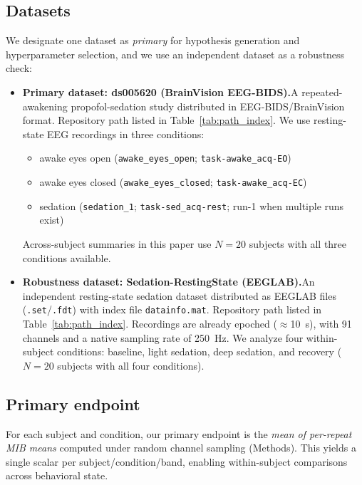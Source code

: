 \documentclass[11pt]{article}
\begin{document}
\subsection{Datasets}
We designate one dataset as \emph{primary} for hypothesis generation and hyperparameter selection, and we use an independent dataset as a robustness check:
\begin{itemize}[leftmargin=*]
    \item \textbf{Primary dataset: ds005620 (BrainVision EEG-BIDS).}\newline A repeated-awakening propofol-sedation study distributed in EEG-BIDS/BrainVision format. Repository path listed in Table~\ref{tab:path_index}. We use resting-state EEG recordings in three conditions:
    \begin{itemize}[leftmargin=*]
        \item awake eyes open (\texttt{awake\_eyes\_open}; \texttt{task-awake\_acq-EO})
        \item awake eyes closed (\texttt{awake\_eyes\_closed}; \texttt{task-awake\_acq-EC})
        \item sedation (\texttt{sedation\_1}; \texttt{task-sed\_acq-rest}; run-1 when multiple runs exist)
    \end{itemize}
    Across-subject summaries in this paper use $N=20$ subjects with all three conditions available.
    \item \textbf{Robustness dataset: Sedation-RestingState (EEGLAB).}\newline An independent resting-state sedation dataset distributed as EEGLAB files (\texttt{.set}/\texttt{.fdt}) with index file \texttt{datainfo.mat}. Repository path listed in Table~\ref{tab:path_index}. Recordings are already epoched ($\approx$\SI{10}{s}), with 91 channels and a native sampling rate of \SI{250}{Hz}. We analyze four within-subject conditions: baseline, light sedation, deep sedation, and recovery ($N=20$ subjects with all four conditions).
\end{itemize}

\subsection{Primary endpoint}
For each subject and condition, our primary endpoint is the \emph{mean of per-repeat MIB means} computed under random channel sampling (Methods). This yields a single scalar per subject/condition/band, enabling within-subject comparisons across behavioral state.
\end{document}
